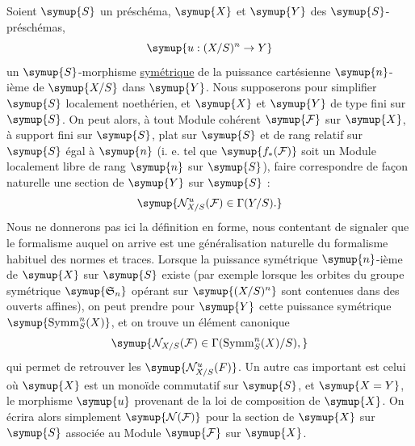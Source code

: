 Soient $\symup{S}$ un préschéma, $\symup{X}$ et $\symup{Y}$ des $\symup{S}$-préschémas,
\[
\symup{u:(X/S)^n\to Y}
\]
un $\symup{S}$-morphisme \uline{symétrique} de la puissance cartésienne $\symup{n}$-ième de $\symup{X/S}$ dans
$\symup{Y}$. Nous supposerons pour simplifier $\symup{S}$ localement noethérien, et $\symup{X}$ et $\symup{Y}$
de type fini sur $\symup{S}$. On peut alors, à tout Module cohérent $\symup{\mathcal F}$ sur
$\symup{X}$, à support fini sur $\symup{S}$, plat sur $\symup{S}$ et de rang relatif sur $\symup{S}$ égal à $\symup{n}$
(i. e. tel que $\symup{f_*(\mathcal F)}$ soit un Module localement libre de rang $\symup{n}$ sur
$\symup{S}$), faire correspondre de façon naturelle une section de $\symup{Y}$ sur $\symup{S}$ :
\[
\symup{\mathcal N^u_{X/S}(\mathcal F)\in\Gamma(Y/S).}
\]
Nous ne donnerons pas ici la définition en forme, nous contentant de signaler
que le formalisme auquel on arrive est une généralisation naturelle du
formalisme habituel des normes et traces. Lorsque la puissance symétrique $\symup{n}$-ième de $\symup{X}$ sur $\symup{S}$ existe (par exemple lorsque les orbites du groupe symétrique $\symup{\mathfrak S_n}$ opérant sur $\symup{(X/S)^n}$ sont contenues dans des ouverts affines), on peut prendre pour $\symup{Y}$ cette puissance symétrique $\symup{\operatorname{Symm}^n_S(X)}$, et on trouve un élément canonique
\[
\symup{\mathcal N_{X/S}(\mathcal F)\in\Gamma(\operatorname{Symm}^n_S(X)/S),}
\]
qui permet de retrouver les $\symup{\mathcal N^u_{X/S}(F)}$. Un autre cas important
est celui où $\symup{X}$ est un monoïde commutatif sur $\symup{S}$, et $\symup{X=Y}$, le morphisme $\symup{u}$
provenant de la loi de composition de $\symup{X}$. On écrira alors simplement
$\symup{\mathcal N(\mathcal F)}$ pour la section de $\symup{X}$ sur $\symup{S}$ associée au Module
$\symup{\mathcal F}$ sur $\symup{X}$.

